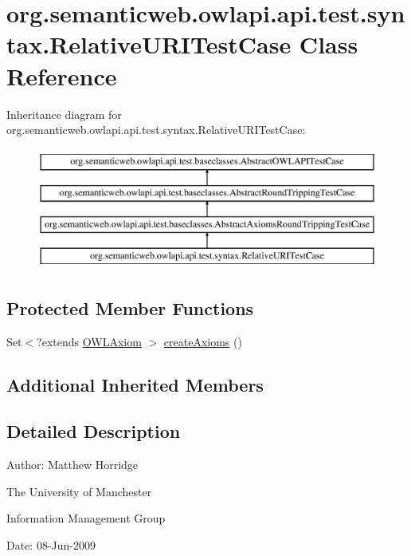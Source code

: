 \hypertarget{classorg_1_1semanticweb_1_1owlapi_1_1api_1_1test_1_1syntax_1_1_relative_u_r_i_test_case}{\section{org.\-semanticweb.\-owlapi.\-api.\-test.\-syntax.\-Relative\-U\-R\-I\-Test\-Case Class Reference}
\label{classorg_1_1semanticweb_1_1owlapi_1_1api_1_1test_1_1syntax_1_1_relative_u_r_i_test_case}
}
Inheritance diagram for org.\-semanticweb.\-owlapi.\-api.\-test.\-syntax.\-Relative\-U\-R\-I\-Test\-Case\-:\begin{figure}[H]
\begin{center}
\leavevmode
\includegraphics[height=4.000000cm]{classorg_1_1semanticweb_1_1owlapi_1_1api_1_1test_1_1syntax_1_1_relative_u_r_i_test_case}
\end{center}
\end{figure}
\subsection*{Protected Member Functions}
\begin{DoxyCompactItemize}
\item 
Set$<$?extends \hyperlink{interfaceorg_1_1semanticweb_1_1owlapi_1_1model_1_1_o_w_l_axiom}{O\-W\-L\-Axiom} $>$ \hyperlink{classorg_1_1semanticweb_1_1owlapi_1_1api_1_1test_1_1syntax_1_1_relative_u_r_i_test_case_a37b380a50f6240667f5c243647014b8c}{create\-Axioms} ()
\end{DoxyCompactItemize}
\subsection*{Additional Inherited Members}


\subsection{Detailed Description}
Author\-: Matthew Horridge\par
 The University of Manchester\par
 Information Management Group\par
 Date\-: 08-\/\-Jun-\/2009 

